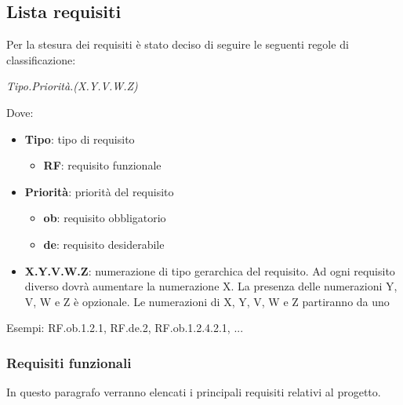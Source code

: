 \subsection{Lista requisiti}
Per la stesura dei requisiti \`{e} stato deciso di seguire le seguenti regole di classificazione:

\begin{doublespace}
\begin{center}
\emph{Tipo.Priorit\`{a}.(X.Y.V.W.Z)}
\par\end{center}
\end{doublespace}

Dove:
\begin{itemize}
\item \textbf{Tipo}: tipo di requisito

\begin{itemize}
\item \textbf{RF}: requisito funzionale
\end{itemize}

\item \textbf{Priorit\`{a}}: priorit\`{a} del requisito

\begin{itemize}
\item \textbf{ob}: requisito obbligatorio
\item \textbf{de}: requisito desiderabile

\end{itemize}
\item \textbf{X.Y.V.W.Z}: numerazione di tipo gerarchica del requisito. Ad ogni requisito diverso dovr\`{a} aumentare la numerazione X. La presenza delle
numerazioni Y, V, W e Z \`{e} opzionale. Le numerazioni di X, Y, V, W e Z partiranno da uno
\end{itemize}
Esempi: RF.ob.1.2.1, RF.de.2, RF.ob.1.2.4.2.1, ...

\subsubsection{Requisiti funzionali}
In questo paragrafo verranno elencati i principali requisiti relativi al progetto.

